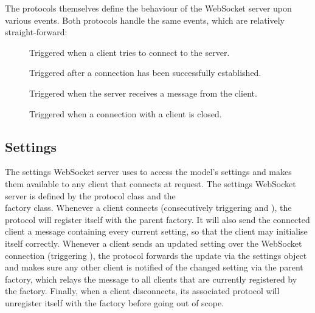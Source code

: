 \documentclass[a4paper, openany, oneside]{memoir}
\begin{document}
The protocols themselves define the behaviour of the WebSocket server upon various events. Both protocols handle the same events, which are relatively straight-forward:
\begin{description}
	\item[] Triggered when a client tries to connect to the server.
	\item[] Triggered after a connection has been successfully established.
	\item[] Triggered when the server receives a message from the client.
	\item[] Triggered when a connection with a client is closed.
\end{description}

\subsection{Settings}
\label{sub:websocket_settings}
The settings WebSocket server uses  to access the model's settings and makes them available to any client that connects at request. The settings WebSocket server is defined by the  protocol class and the\\  factory class.
Whenever a client connects (consecutively triggering  and ), the protocol will register itself with the parent factory. It will also send the connected client a message containing every current setting, so that the client may initialise itself correctly. Whenever a client sends an updated setting over the WebSocket connection (triggering ), the protocol forwards the update via the  settings object and makes sure any other client is notified of the changed setting via the parent factory, which relays the message to all clients that are currently registered by the factory. Finally, when a client disconnects, its associated protocol will unregister itself with the factory before going out of scope.
\end{document}
